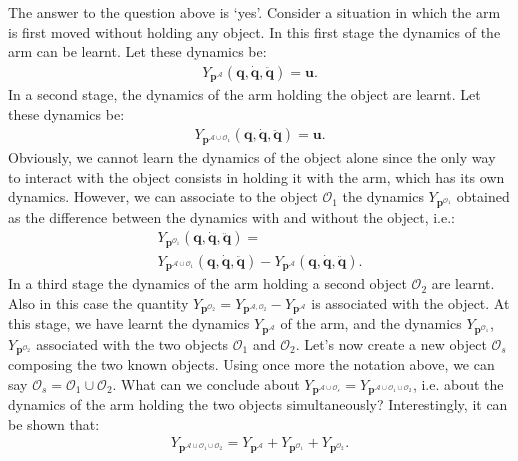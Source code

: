 \documentclass{svmult}
\begin{document}
The answer to the question above is `yes'. Consider a situation in
which the arm is first moved without holding any object. In this
first stage the dynamics of the arm can be learnt. Let these
dynamics be:
\begin{eqnarray} \label{Eq:DynModArmAlone}
Y_{\mathbf p^{\mathcal A}}(\mathbf q, \dot{\mathbf q}, \ddot{\mathbf
q}) = \mathbf u.
\end{eqnarray}
In a second stage, the dynamics of the arm holding the object are
learnt. Let these dynamics be:
\begin{eqnarray} \label{Eq:DynModArmObject}
Y_{\mathbf p^{\mathcal A \cup \mathcal O_1}}(\mathbf q, \dot{\mathbf
q}, \ddot{\mathbf q}) = \mathbf u.
\end{eqnarray}
Obviously, we cannot learn the dynamics of the object alone since
the only way to interact with the object consists in holding it with
the arm, which has its own dynamics. However, we can associate to
the object $\mathcal O_1$ the dynamics $Y_{\mathbf p^{\mathcal
O_1}}$ obtained as the difference between the dynamics with and
without the object, i.e.:
\begin{multline} \label{Eq:DynModArmObjectDiff}
Y_{\mathbf p^{\mathcal O_1}}(\mathbf q, \dot{\mathbf q},
\ddot{\mathbf q}) = \\ Y_{\mathbf p^{\mathcal A \cup \mathcal
O_1}}(\mathbf q, \dot{\mathbf q}, \ddot{\mathbf q}) - Y_{\mathbf
p^{\mathcal A}}(\mathbf q, \dot{\mathbf q}, \ddot{\mathbf q}).
\end{multline}
In a third stage the dynamics of the arm holding a second object
$\mathcal O_2$ are learnt. Also in this case the quantity
$Y_{\mathbf p^{\mathcal O_2}} = Y_{\mathbf p^{\mathcal A, \mathcal
O_2}} - Y_{\mathbf p^{\mathcal A}}$ is associated with the object.
At this stage, we have learnt the dynamics $Y_{\mathbf p^{\mathcal
A}}$ of the arm, and the dynamics $Y_{\mathbf p^{\mathcal O_1}}$,
$Y_{\mathbf p^{\mathcal O_2}}$ associated with the two objects
${\mathcal O_1}$ and ${\mathcal O_2}$. Let's now create a new object
$\mathcal O_s$ composing the two known objects. Using once more the
notation above, we can say $\mathcal O_s = \mathcal O_1 \cup
\mathcal O_2$. What can we conclude about $Y_{\mathbf p^{\mathcal A
\cup \mathcal O_s}} = Y_{\mathbf p^{\mathcal A \cup \mathcal O_1
\cup \mathcal O_2 }}$, i.e. about the dynamics of the arm holding
the two objects simultaneously? Interestingly, it can be shown that:
\begin{eqnarray} \label{Eq:AdditivityContexts}
Y_{\mathbf p^{\mathcal A \cup \mathcal O_1 \cup \mathcal O_2}} =
Y_{\mathbf p^{\mathcal A}} + Y_{\mathbf p^{\mathcal O_1}} +
Y_{\mathbf p^{\mathcal O_2}}.
\end{eqnarray}
\end{document}
